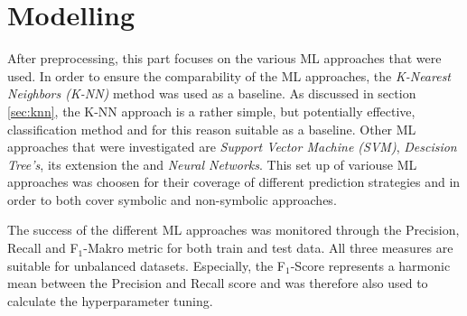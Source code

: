 \chapter{Modelling}\label{sec:data_mining}





After preprocessing, this part focuses on the various ML approaches that were used. In order to ensure the comparability of the ML approaches, the \textit{K-Nearest Neighbors (K-NN)} method was used as a baseline. As discussed in section \ref{sec:knn}, the K-NN approach is a rather simple, but potentially effective, classification method and for this reason suitable as a baseline. Other ML approaches that were investigated are \textit{Support Vector Machine (SVM)}, \textit{Descision Tree's}, its extension the  and \textit{Neural Networks}. This set up of variouse ML approaches was choosen for their coverage of different prediction strategies and in order to both cover symbolic and non-symbolic approaches.

The success of the different ML approaches was monitored through the Precision, Recall and F$_1$-Makro metric for both train and test data. All three measures are suitable for unbalanced datasets. \citep{Brownlee2020} Especially, the F$_1$-Score represents a harmonic mean between the Precision and Recall score and was therefore also used to calculate the hyperparameter tuning.\citep{Peltarion2021}


